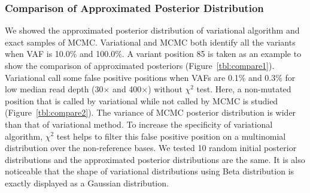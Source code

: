 \documentclass[11pt,reqno]{amsart}
\begin{document}
\subsubsection{Comparison of Approximated Posterior Distribution}
We showed the approximated posterior distribution of variational algorithm and exact samples of MCMC.
Variational and MCMC both identify all the variants when VAF is 10.0\% and 100.0\%.
A variant position 85 is taken as an example to show the comparison of approximated posteriors (Figure~\ref{tbl:compare1}).
Variational call some false positive positions when VAFs are 0.1\% and 0.3\% for low median read depth (30$\times$ and 400$\times$) without $\chi^2$ test.
Here, a non-mutated position that is called by variational while not called by MCMC is studied (Figure~\ref{tbl:compare2}).
The variance of MCMC posterior distribution is wider than that of variational method. %
To increase the specificity of variational algorithm, $\chi^2$ test helps to filter this false positive position on a multinomial distribution over the non-reference bases.
We tested 10 random initial posterior distributions and the approximated posterior distributions are the same.
It is also noticeable that the shape of variational distributions using Beta distribution is exactly displayed as a Gaussian distribution.
\end{document}
